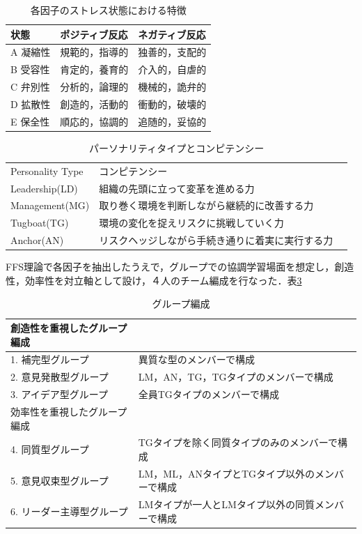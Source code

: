 \documentclass{funthesis}
\begin{document}
\begin{table}[h]
\begin{center}
  \begin{tabular}{lll} \hline
    状態 & ポジティブ反応 & ネガティブ反応\tabularnewline \hline
    A 凝縮性& 規範的，指導的 & 
    独善的，支配的\tabularnewline
    B 受容性 &肯定的，養育的 & 
    介入的，自虐的\tabularnewline
    C 弁別性&分析的，論理的 &
    機械的，詭弁的\tabularnewline
    D 拡散性&創造的，活動的 &
    衝動的，破壊的\tabularnewline
    E 保全性&順応的，協調的 &
    追随的，妥協的\tabularnewline
    \hline
  \end{tabular}
  \caption{各因子のストレス状態における特徴}
  \label{FFS理論}
  \end{center}
\end{table}

\begin{table}[h]
\begin{center}
  \begin{tabular}{lll} \hline
    Personality Type &  コンピテンシー\tabularnewline
   Leadership(LD)& 組織の先頭に立って変革を進める力  \tabularnewline
    Management(MG) & 取り巻く環境を判断しながら継続的に改善する力 \tabularnewline
    Tugboat(TG)& 環境の変化を捉えリスクに挑戦していく力\tabularnewline
    Anchor(AN)&リスクヘッジしながら手続き通りに着実に実行する力 \tabularnewline
    \hline
  \end{tabular}
  \caption{パーソナリティタイプとコンピテンシー}
  \label{FFS理論2}
  \end{center}
\end{table}

FFS理論で各因子を抽出したうえで，グループでの協調学習場面を想定し，創造性，効率性を対立軸として設け，４人のチーム編成を行なった．表\ref{FFS理論3}

\begin{table}[h]
\begin{center}
  \begin{tabular}{ll} \hline
    創造性を重視したグループ編成\tabularnewline \hline
   1. 補完型グループ& 異質な型のメンバーで構成  \tabularnewline
   2. 意見発散型グループ & LM，AN，TG，TGタイプのメンバーで構成 \tabularnewline
    3. アイデア型グループ& 全員TGタイプのメンバーで構成\tabularnewline \hline
    効率性を重視したグループ編成 \tabularnewline \hline
    4. 同質型グループ& TGタイプを除く同質タイプのみのメンバーで構成  \tabularnewline
    5. 意見収束型グループ & LM，ML，ANタイプとTGタイプ以外のメンバーで構成 \tabularnewline
    6. リーダー主導型グループ&LMタイプが一人とLMタイプ以外の同質メンバーで構成\tabularnewline
    \hline
  \end{tabular}
  \caption{グループ編成}
  \label{FFS理論3}
  \end{center}
\end{table}
\end{document}
